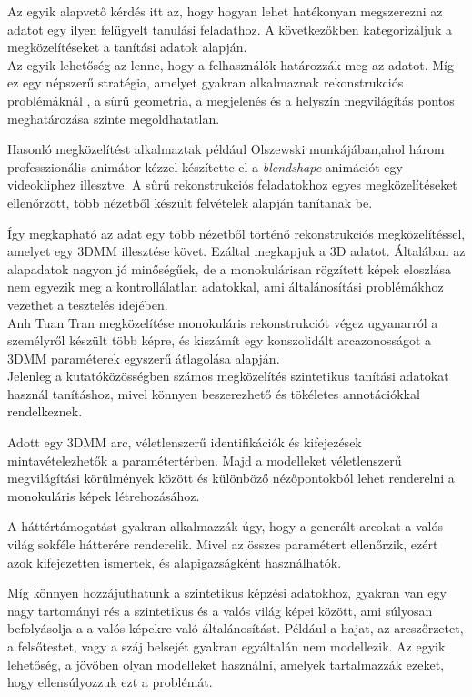 \documentclass[12pt,a4]{article}
\begin{document}
	
	Az egyik alapvető kérdés itt az, hogy hogyan lehet hatékonyan megszerezni az adatot egy ilyen felügyelt tanulási feladathoz. A következőkben
	kategorizáljuk a megközelítéseket a
	tanítási adatok alapján. \\
	
	
	Az egyik lehetőség az lenne, hogy a felhasználók határozzák meg az adatot. Míg ez egy népszerű stratégia, amelyet gyakran alkalmaznak rekonstrukciós problémáknál \cite{saragih}, 
	a sűrű geometria, a megjelenés és a helyszín megvilágítás pontos meghatározása szinte megoldhatatlan.
	
	
	Hasonló megközelítést alkalmaztak például Olszewski \cite{olszewski} munkájában,ahol három professzionális animátor kézzel készítette el a \textit{blendshape} animációt egy videokliphez illesztve. A sűrű rekonstrukciós feladatokhoz egyes megközelítéseket ellenőrzött, több nézetből készült felvételek alapján tanítanak be.
	
	
	Így megkapható az adat egy több nézetből történő rekonstrukciós megközelítéssel, amelyet egy 3DMM illesztése követ. Ezáltal  megkapjuk a 3D adatot. Általában az alapadatok nagyon jó minőségűek,
	de a monokulárisan rögzített képek eloszlása nem
	egyezik meg a kontrollálatlan adatokkal, ami általánosítási problémákhoz vezethet
	a tesztelés idejében.\\
	
	
	Anh Tuan Tran megközelítése monokuláris rekonstrukciót végez ugyanarról a személyről készült több képre, és kiszámít egy konszolidált arcazonosságot a 3DMM paraméterek egyszerű átlagolása alapján. \\
	
	
	Jelenleg a kutatóközösségben számos megközelítés szintetikus tanítási adatokat használ tanításhoz, mivel könnyen beszerezhető és tökéletes annotációkkal rendelkeznek. 
	
	
	Adott egy 3DMM arc, véletlenszerű identifikációk és kifejezések mintavételezhetők a paramétertérben. 
	Majd
	a modelleket véletlenszerű megvilágítási körülmények között és különböző nézőpontokból lehet renderelni a monokuláris képek létrehozásához. 
	
	
	A háttértámogatást gyakran alkalmazzák úgy, hogy a generált arcokat a valós világ sokféle hátterére renderelik. Mivel az összes paramétert ellenőrzik, ezért azok kifejezetten ismertek, és alapigazságként használhatók.
	
	
	Míg könnyen hozzájuthatunk a szintetikus képzési adatokhoz, gyakran van egy nagy tartományi rés
	a szintetikus és a valós világ képei között, ami súlyosan befolyásolja a
	a valós képekre való általánosítást. Például a hajat, az arcszőrzetet, a felsőtestet,
	vagy a száj belsejét gyakran egyáltalán nem modellezik. Az egyik lehetőség,
	a jövőben olyan modelleket használni, amelyek tartalmazzák ezeket, hogy ellensúlyozzuk ezt a problémát. 
	
\end{document}
